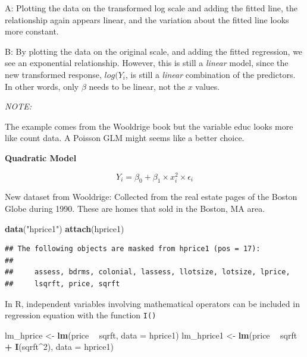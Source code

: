 \documentclass[]{book}
\newenvironment{Shaded}{\begin{snugshade}}{\end{snugshade}}
\newcommand{\DataTypeTok}[1]{\textcolor[rgb]{0.13,0.29,0.53}{#1}}
\newcommand{\DecValTok}[1]{\textcolor[rgb]{0.00,0.00,0.81}{#1}}
\newcommand{\KeywordTok}[1]{\textcolor[rgb]{0.13,0.29,0.53}{\textbf{#1}}}
\newcommand{\NormalTok}[1]{#1}
\newcommand{\OperatorTok}[1]{\textcolor[rgb]{0.81,0.36,0.00}{\textbf{#1}}}
\newcommand{\StringTok}[1]{\textcolor[rgb]{0.31,0.60,0.02}{#1}}
\begin{document}
A: Plotting the data on the transformed log scale and adding the fitted
line, the relationship again appears linear, and the variation about the
fitted line looks more constant.

B: By plotting the data on the original scale, and adding the fitted
regression, we see an exponential relationship. However, this is still a
\emph{linear} model, since the new transformed response, \(log(Y_{i}\),
is still a \emph{linear} combination of the predictors. In other words,
only \(\beta\) needs to be linear, not the \(x\) values.

\emph{NOTE:}

The example comes from the Wooldrige book but the variable educ looks
more like count data. A Poisson GLM might seems like a better choice.

\textbf{Quadratic Model}

\begin{equation}
Y_{i} = \beta_{0} + \beta_{1} \times x^2_{i}  \times \epsilon_{i}
\end{equation}

New dataset from Wooldrige: Collected from the real estate pages of the
Boston Globe during 1990. These are homes that sold in the Boston, MA
area.

\begin{Shaded}
\begin{Highlighting}[]
\KeywordTok{data}\NormalTok{(}\StringTok{"hprice1"}\NormalTok{)}
\KeywordTok{attach}\NormalTok{(hprice1)}
\end{Highlighting}
\end{Shaded}

\begin{verbatim}
## The following objects are masked from hprice1 (pos = 17):
## 
##     assess, bdrms, colonial, lassess, llotsize, lotsize, lprice,
##     lsqrft, price, sqrft
\end{verbatim}

In R, independent variables involving mathematical operators can be
included in regression equation with the function \texttt{I()}

\begin{Shaded}
\begin{Highlighting}[]
\NormalTok{lm_hprice <-}\StringTok{ }\KeywordTok{lm}\NormalTok{(price }\OperatorTok{~}\StringTok{ }\NormalTok{sqrft, }\DataTypeTok{data  =}\NormalTok{ hprice1)}
\NormalTok{lm_hprice1 <-}\StringTok{ }\KeywordTok{lm}\NormalTok{(price }\OperatorTok{~}\StringTok{ }\NormalTok{sqrft }\OperatorTok{+}\StringTok{ }\KeywordTok{I}\NormalTok{(sqrft}\OperatorTok{^}\DecValTok{2}\NormalTok{), }\DataTypeTok{data  =}\NormalTok{ hprice1)}
\end{Highlighting}
\end{Shaded}
\end{document}
